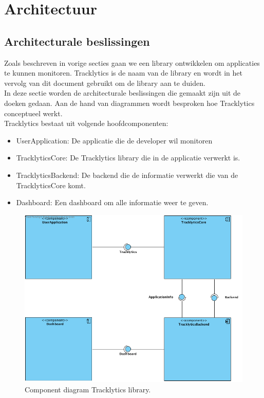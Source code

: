 \chapter{Architectuur}

\section{Architecturale beslissingen}
Zoals beschreven in vorige secties gaan we een library ontwikkelen om applicaties te kunnen monitoren. Tracklytics is de naam van de library en wordt in het vervolg van dit document gebruikt om de library aan te duiden. \\
In deze sectie worden de architecturale beslissingen die gemaakt zijn uit de doeken gedaan. Aan de hand van diagrammen wordt besproken hoe Tracklytics conceptueel werkt. \\


Tracklytics bestaat uit volgende hoofdcomponenten:
\begin{itemize}
\item UserApplication: De applicatie die de developer wil monitoren
\item TracklyticsCore: De Tracklytics library die in de applicatie verwerkt is.
\item TracklyticsBackend: De backend die de informatie verwerkt die van de TracklyticsCore komt.
\item Dashboard: Een dashboard om alle informatie weer te geven.
\end{itemize}

\begin{figure}[!h]
  \centering
  \includegraphics[scale=0.4]{Afbeeldingen/Architectuur/Component}
  \caption{Component diagram Tracklytics library.}
  \label{fig:component}
\end{figure}

